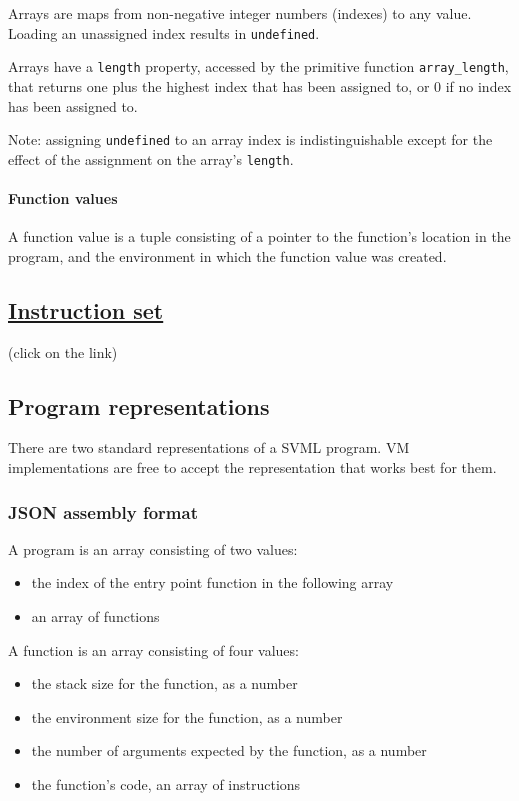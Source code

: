 Arrays are maps from non-negative integer numbers (indexes) to any
value. Loading an unassigned index results in \texttt{undefined}.

Arrays have a \texttt{length} property, accessed by the primitive
function \texttt{array\_length}, that returns one plus the highest index
that has been assigned to, or 0 if no index has been assigned to.

Note: assigning \texttt{undefined} to an array index is
indistinguishable except for the effect of the assignment on the array's
\texttt{length}.

\paragraph{Function values}

A function value is a tuple consisting of a pointer to the function's
location in the program, and the environment in which the function value
was created.

\subsection{\texorpdfstring{\href{SVML-Instruction-Set}{Instruction
set}}{Instruction set}}

(click on the link)

\subsection{Program representations}

There are two standard representations of a SVML program. VM
implementations are free to accept the representation that works best
for them.

\subsubsection{JSON assembly format}

A program is an array consisting of two values:

\begin{itemize}
\item
  the index of the entry point function in the following array
\item
  an array of functions
\end{itemize}

A function is an array consisting of four values:

\begin{itemize}
\item
  the stack size for the function, as a number
\item
  the environment size for the function, as a number
\item
  the number of arguments expected by the function, as a number
\item
  the function's code, an array of instructions
\end{itemize}

